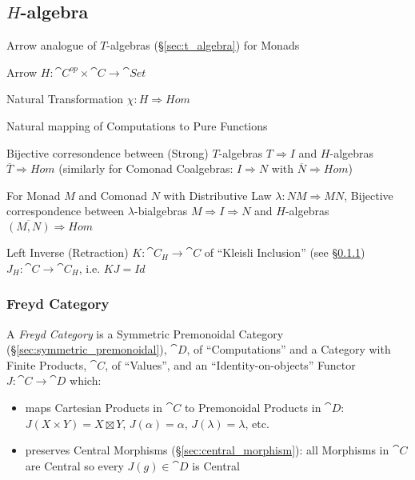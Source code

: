 \subsection{$H$-algebra}\label{sec:h_algebra}
\cite{jacobs-heunen-hasuo09}


Arrow analogue of $T$-algebras (\S\ref{sec:t_algebra}) for Monads

Arrow $H : \cat{C}^{op} \times \cat{C} \rightarrow \cat{Set}$

Natural Transformation $\chi : H \Rightarrow Hom$

Natural mapping of Computations to Pure Functions

Bijective corresondence between (Strong) $T$-algebras $T \Rightarrow
I$ and $H$-algebras $\overline{T} \Rightarrow Hom$ (similarly for
Comonad Coalgebras: $I \Rightarrow N$ with $\overline{N} \Rightarrow
Hom$)

For Monad $M$ and Comonad $N$ with Distributive Law $\lambda : N M
\Rightarrow M N$, Bijective correspondence between
$\lambda$-bialgebras $M \Rightarrow I \Rightarrow N$ and $H$-algebras
$\overline{(M,N)} \Rightarrow Hom$

Left Inverse (Retraction) $K : \cat{C}_H \rightarrow \cat{C}$ of
``Kleisli Inclusion'' (see \S\ref{sec:freyd_category}) $J_H : \cat{C}
\rightarrow \cat{C}_H$, i.e. $K J = Id$



\subsubsection{Freyd Category}\label{sec:freyd_category}

A \emph{Freyd Category} is a Symmetric Premonoidal Category
(\S\ref{sec:symmetric_premonoidal}), $\cat{D}$, of
``Computations'' and a Category with Finite Products, $\cat{C}$, of
``Values'', and an ``Identity-on-objects'' Functor $J : \cat{C}
\rightarrow \cat{D}$ which:
\begin{itemize}
\item maps Cartesian Products in $\cat{C}$ to Premonoidal Products in
  $\cat{D}$: $J(X \times Y) = X \boxtimes Y$, $J(\alpha) = \alpha$,
  $J(\lambda) = \lambda$, etc.
\item preserves Central Morphisms (\S\ref{sec:central_morphism}): all
  Morphisms in $\cat{C}$ are Central so every $J(g) \in \cat{D}$ is
  Central
\end{itemize}
\cite{jacobs-heunen-hasuo09}

